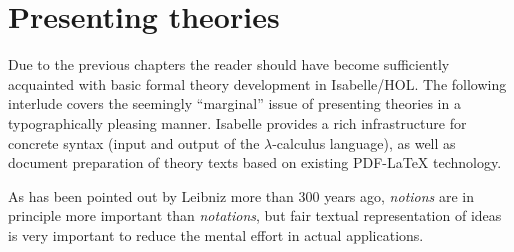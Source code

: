 
\chapter{Presenting theories}
\label{ch:thy-present}

Due to the previous chapters the reader should have become sufficiently
acquainted with basic formal theory development in Isabelle/HOL.  The
following interlude covers the seemingly ``marginal'' issue of presenting
theories in a typographically pleasing manner.  Isabelle provides a rich
infrastructure for concrete syntax (input and output of the $\lambda$-calculus
language), as well as document preparation of theory texts based on existing
PDF-{\LaTeX} technology.

As has been pointed out by Leibniz more than
300 years ago, \emph{notions} are in principle more important than
\emph{notations}, but fair textual representation of ideas is very important
to reduce the mental effort in actual applications.




